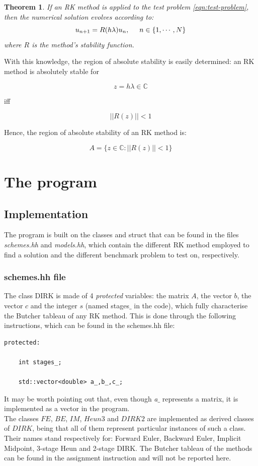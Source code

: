\documentclass[11pt]{article}
\theoremstyle{theorem}
\newtheorem{theorem}{Theorem}
\theoremstyle{definition}
\begin{document}
\begin{theorem}
	\label{thhm:sol-evol-RK}
	If an RK method is applied to the test problem \eqref{eqn:test-problem}, then the numerical solution evolves according to:
	$$u_{n+1}=R(h\lambda)u_n,\hspace{5mm}n\in\lbrace1,\cdots,N\rbrace$$
	where $R$ is the method's stability function.\\
\end{theorem}

With this knowledge, the region of absolute stability is easily determined: an RK
method is absolutely stable for

$$ z=h\lambda\in\mathbb{C} $$

iff

$$||R(z)||<1$$

Hence, the region of absolute stability of an RK method is:

$$A=\lbrace z\in\mathbb{C}:||R(z)||<1\rbrace$$


\section{The program}
\subsection{Implementation}
The program is built on the classes and struct that can be found in the files \emph{schemes.hh} and \emph{models.hh}, which contain the different RK method employed to find a solution and the different benchmark problem to test on, respectively.\\
\subsubsection{schemes.hh file}
\label{subsubsec:schemes}
The class DIRK is made of 4 \emph{protected} variables: the matrix $A$, the vector $b$, the vector $c$ and the integer $s$ (named stages$\_$ in the code), which fully characterise the Butcher tableau of any RK method. This is done through the following instructions, which can be found in the schemes.hh file:

\begin{lstlisting}
protected:

	int stages_;

	std::vector<double> a_,b_,c_;
\end{lstlisting}

It may be worth pointing out that, even though \emph{a$\_$} represents a matrix, it is implemented as a vector in the program.\\
The classes $FE$, $BE$, $IM$, $Heun3$ and $DIRK2$ are implemented as derived classes of $DIRK$, being that all of them represent particular instances of such a class. Their names stand respectively for: Forward Euler, Backward Euler, Implicit Midpoint, 3-stage Heun and 2-stage DIRK. The Butcher tableau of the methods can be found in the assignment instruction and will not be reported here.\\
\end{document}
